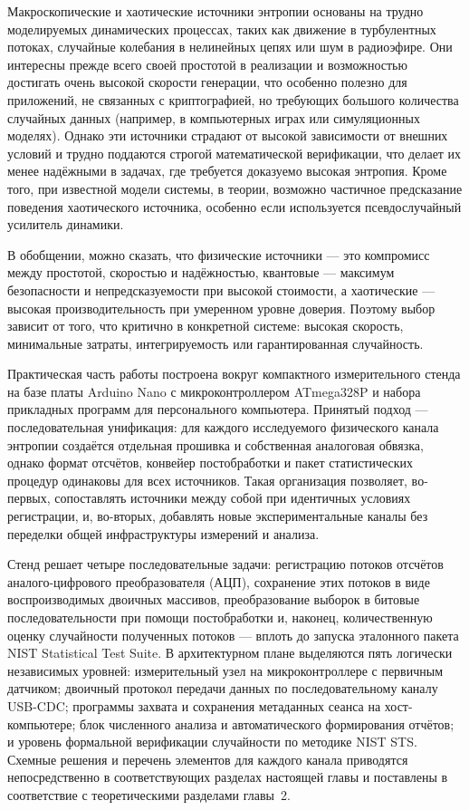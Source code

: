 Макроскопические и хаотические источники энтропии основаны на трудно
моделируемых динамических процессах, таких как движение в турбулентных
потоках, случайные колебания в нелинейных цепях или шум в радиоэфире.
Они интересны прежде всего своей простотой в реализации и возможностью
достигать очень высокой скорости генерации, что особенно полезно для
приложений, не связанных с криптографией, но требующих большого
количества случайных данных (например, в компьютерных играх или
симуляционных моделях). Однако эти источники страдают от высокой
зависимости от внешних условий и трудно поддаются строгой математической
верификации, что делает их менее надёжными в задачах, где требуется
доказуемо высокая энтропия. Кроме того, при известной модели системы, в
теории, возможно частичное предсказание поведения хаотического
источника, особенно если используется псевдослучайный усилитель
динамики.

В обобщении, можно сказать, что физические источники --- это компромисс
между простотой, скоростью и надёжностью, квантовые --- максимум
безопасности и непредсказуемости при высокой стоимости, а хаотические ---
высокая производительность при умеренном уровне доверия. Поэтому выбор
зависит от того, что критично в конкретной системе: высокая скорость,
минимальные затраты, интегрируемость или гарантированная случайность.


Практическая часть работы построена вокруг компактного измерительного стенда на базе
платы Arduino Nano с микроконтроллером ATmega328P и набора прикладных программ для
персонального компьютера. Принятый подход --- последовательная унификация: для каждого
исследуемого физического канала энтропии создаётся отдельная прошивка и собственная
аналоговая обвязка, однако формат отсчётов, конвейер постобработки и пакет статистических
процедур одинаковы для всех источников. Такая организация позволяет, во-первых,
сопоставлять источники между собой при идентичных условиях регистрации, и, во-вторых,
добавлять новые экспериментальные каналы без переделки общей инфраструктуры
измерений и анализа.


Стенд решает четыре последовательные задачи: регистрацию потоков отсчётов
аналого-цифрового преобразователя (АЦП), сохранение этих потоков в виде воспроизводимых
двоичных массивов, преобразование выборок в битовые последовательности при помощи
постобработки и, наконец, количественную оценку случайности полученных потоков ---
вплоть до запуска эталонного пакета NIST Statistical Test Suite. В архитектурном плане
выделяются пять логически независимых уровней: измерительный узел на микроконтроллере
с первичным датчиком; двоичный протокол передачи данных по последовательному
каналу USB-CDC; программы захвата и сохранения метаданных сеанса на хост-компьютере;
блок численного анализа и автоматического формирования отчётов; и уровень формальной
верификации случайности по методике NIST STS. Схемные решения и перечень элементов
для каждого канала приводятся непосредственно в соответствующих разделах настоящей
главы и поставлены в соответствие с теоретическими разделами главы~2.

